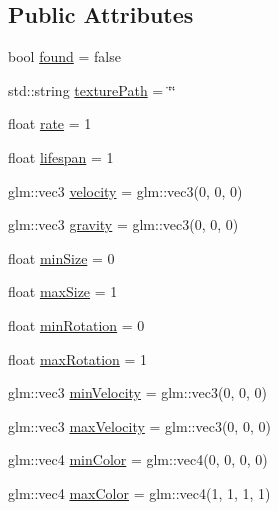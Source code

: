 \subsection*{Public Attributes}
\begin{DoxyCompactItemize}
\item 
bool \hyperlink{class_mason_1_1_particle_descriptor_a4e686866e2431ae666800ead5d1638c4}{found} = false
\item 
std\+::string \hyperlink{class_mason_1_1_particle_descriptor_a060bb2c95075b3a19432beca816bfa76}{texture\+Path} = \char`\"{}\char`\"{}
\item 
float \hyperlink{class_mason_1_1_particle_descriptor_a250f9c2c5b3fa119d0a38311e301fd2a}{rate} = 1
\item 
float \hyperlink{class_mason_1_1_particle_descriptor_ac38adbef0e6dfa77dd42ade2089595fc}{lifespan} = 1
\item 
glm\+::vec3 \hyperlink{class_mason_1_1_particle_descriptor_a015f949d8089667eea16540fb750f70a}{velocity} = glm\+::vec3(0, 0, 0)
\item 
glm\+::vec3 \hyperlink{class_mason_1_1_particle_descriptor_abd5c0046bb19ee434c56f713c58103c3}{gravity} = glm\+::vec3(0, 0, 0)
\item 
float \hyperlink{class_mason_1_1_particle_descriptor_a5bbc1147b832c903cee0b6ebe964d8c3}{min\+Size} = 0
\item 
float \hyperlink{class_mason_1_1_particle_descriptor_a394842f237899eb5fcd3091c8dd2ba89}{max\+Size} = 1
\item 
float \hyperlink{class_mason_1_1_particle_descriptor_a086f4988188e22f066e93529cb02608c}{min\+Rotation} = 0
\item 
float \hyperlink{class_mason_1_1_particle_descriptor_a9590c7ad32834d9cce9c24d530e75609}{max\+Rotation} = 1
\item 
glm\+::vec3 \hyperlink{class_mason_1_1_particle_descriptor_a6412dbc10bc67e2e8b21faef1c050a67}{min\+Velocity} = glm\+::vec3(0, 0, 0)
\item 
glm\+::vec3 \hyperlink{class_mason_1_1_particle_descriptor_afc679429239c6e9c40b5c2e75228e2c1}{max\+Velocity} = glm\+::vec3(0, 0, 0)
\item 
glm\+::vec4 \hyperlink{class_mason_1_1_particle_descriptor_a86b3ee8f533d314ed0f0e48228144a25}{min\+Color} = glm\+::vec4(0, 0, 0, 0)
\item 
glm\+::vec4 \hyperlink{class_mason_1_1_particle_descriptor_aa755ad8771cf25c71ec868e16cff41e2}{max\+Color} = glm\+::vec4(1, 1, 1, 1)
\item 

\end{DoxyCompactItemize}
